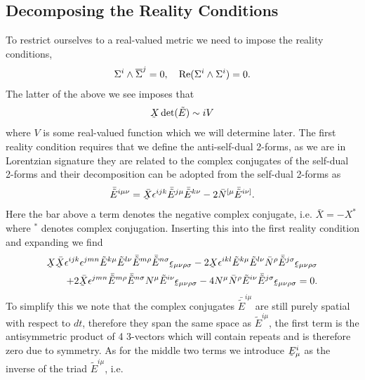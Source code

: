 \documentclass[10pt]{report}
\newcommand{\utilde}[1]{\underaccent{\tilde}{#1}}
\theoremstyle{definition}
\newcommand{\asd}[0]{\overline{\Sigma}}
\newcommand{\uteps}[0]{\utilde{\epsilon}}
\newcommand{\tE}[0]{\tilde{E}}
\newcommand{\utE}[0]{\utilde{E}}
\begin{document}
    \subsection{Decomposing the Reality Conditions}
    To restrict ourselves to a real-valued metric we need to impose the reality conditions,
    \begin{align}
        \Sigma^i \wedge \asd^j = 0, \quad {\rm Re}(\Sigma^i \wedge \Sigma^i) = 0.
    \end{align}
    The latter of the above we see imposes that 
    \begin{align}
        \utilde{X} \det(\tE) \sim i V \label{eq:num-plebanski-1R-reality-condition}
    \end{align}
    where $V$ is some real-valued function which we will determine later. The first reality condition requires that we define the anti-self-dual 2-forms, as we are in Lorentzian signature they are related to the complex conjugates of the self-dual 2-forms and their decomposition can be adopted from the self-dual 2-forms as 
    \begin{align}
        \bar{\tE}^{i\mu\nu} = \bar{\utilde{X}}  \epsilon^{ijk} \bar{\tE}^{j\mu} \bar{\tE}^{k\nu} - 2 \bar{N}^{[\mu} \bar{\tE}^{i\nu]}.
    \end{align}
    Here the bar above a term denotes the negative complex conjugate, i.e. $\bar{X} = -X^*$ where ${}^*$ denotes complex conjugation. Inserting this into the first reality condition and expanding we find 
    \begin{equation} \label{eq:pleb-num-reality-condition-step-1}
        \begin{aligned}
                \utilde{X} \bar{\utilde{X}} \epsilon^{ijk} \epsilon^{jmn} \tE^{k\mu} \tE^{l\nu} \bar{\tE}^{m\rho} \bar{\tE}^{n\sigma} \uteps_{\mu\nu\rho\sigma} - 2\utilde{X} \epsilon^{ikl} \tE^{k\mu} \tE^{l\nu} \bar{N}^\rho \bar{\tE}^{j\sigma} \uteps_{\mu\nu\rho\sigma} \\ +  2 \bar{\utilde{X}} \epsilon^{jmn} \bar{\tE}^{m\rho} \bar{\tE}^{n\sigma} N^\mu \tE^{i\nu} \uteps_{\mu\nu\rho\sigma} - 4 N^\mu \bar{N}^\rho \tE^{i\nu} \bar{\tE}^{j\sigma} \uteps_{\mu\nu\rho\sigma} = 0.
        \end{aligned}
    \end{equation}
    To simplify this we note that the complex conjugates $\bar{\tE}^{i\mu}$ are still purely spatial with respect to $dt$, therefore they span the same space as $\tE^{i\mu}$, the first term is the antisymmetric product of 4 3-vectors which will contain repeats and is therefore zero due to symmetry. As for the middle two terms we introduce $\utE^i_\mu$ as the inverse of the triad $\tE^{i\mu}$, i.e.
\end{document}
